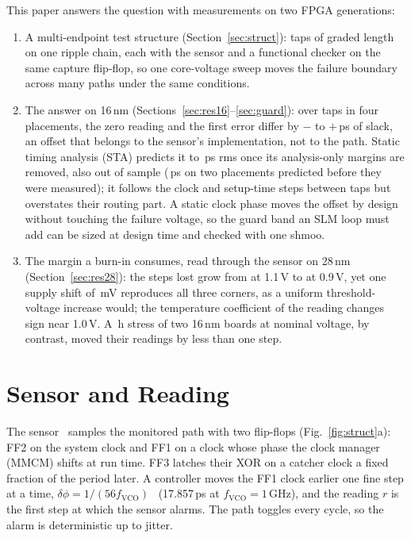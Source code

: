 \documentclass[conference]{IEEEtran}
\begin{document}
This paper answers the question with measurements on two FPGA generations:
\begin{enumerate}
\item A multi-endpoint test structure (Section~\ref{sec:struct}): taps of graded length on one
ripple chain, each with the sensor and a functional checker on the same capture flip-flop, so one
core-voltage sweep moves the failure boundary across many paths under the same conditions.
\item The answer on 16\,nm (Sections~\ref{sec:res16}--\ref{sec:guard}): over \vAllN{} taps in four
placements, the zero reading and the first error differ by $-$\vAllMinPsAbs{} to
$+$\vAllMaxPsAbs\,ps of slack, an offset that belongs to the sensor's implementation, not to the
path. Static timing analysis (STA) predicts it to \vAllRms\,ps rms once its analysis-only margins
are removed, also out of sample (\vCDRms\,ps on two placements predicted before they were
measured); it follows the clock and setup-time steps between taps but overstates their routing
part. A static clock phase moves the offset by design without touching the failure voltage, so the
guard band an SLM loop must add can be sized at design time and checked with one shmoo.
\item The margin a burn-in consumes, read through the sensor on 28\,nm (Section~\ref{sec:res28}):
the steps lost grow from \vDslackHiAbs{} at 1.1\,V to \vDslackLoAbs{} at 0.9\,V, yet one supply
shift of \vShiftmV\,mV reproduces all three corners, as a uniform threshold-voltage increase would;
the temperature coefficient of the reading changes sign near 1.0\,V. A \vUsDurH\,h stress of two
16\,nm boards at nominal voltage, by contrast, moved their readings by less than one step.
\end{enumerate}

\section{Sensor and Reading}\label{sec:sensor}

The sensor~\cite{sbcci25} samples the monitored path with two flip-flops (Fig.~\ref{fig:struct}a):
FF2 on the system clock and FF1 on a clock whose phase the clock manager (MMCM) shifts at run
time. FF3 latches their XOR on a catcher clock a fixed fraction of the period later. A controller
moves the FF1 clock earlier one fine step at a time, $\delta\phi = 1/(56 f_\mathrm{VCO})$~\cite{ug572}
(17.857\,ps at $f_\mathrm{VCO}=1$\,GHz), and the reading $r$ is the first step at which the sensor
alarms. The path toggles every cycle, so the alarm is deterministic up to jitter.
\end{document}
